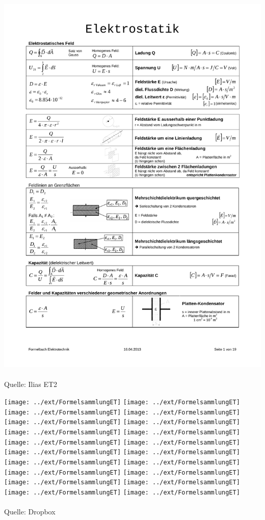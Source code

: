 \includegraphics[page=19,scale=0.57,trim=20mm 20mm 20mm 20mm]{../ext/ET-Formelsammlung}
\\
\\
Quelle: Ilias ET2
\newpage

\texttt{[image: ../ext/FormelsammlungET]}\newpage
\texttt{[image: ../ext/FormelsammlungET]}\newpage
\texttt{[image: ../ext/FormelsammlungET]}\newpage
\texttt{[image: ../ext/FormelsammlungET]}\newpage
\texttt{[image: ../ext/FormelsammlungET]}\newpage
\texttt{[image: ../ext/FormelsammlungET]}\newpage
\texttt{[image: ../ext/FormelsammlungET]}\newpage
\texttt{[image: ../ext/FormelsammlungET]}\newpage
\texttt{[image: ../ext/FormelsammlungET]}\newpage
\texttt{[image: ../ext/FormelsammlungET]}\newpage
\texttt{[image: ../ext/FormelsammlungET]}\newpage
\texttt{[image: ../ext/FormelsammlungET]}\newpage
\texttt{[image: ../ext/FormelsammlungET]}\newpage
\texttt{[image: ../ext/FormelsammlungET]}\newpage
\texttt{[image: ../ext/FormelsammlungET]}\newpage
\texttt{[image: ../ext/FormelsammlungET]}\newpage
\texttt{[image: ../ext/FormelsammlungET]}\newpage
\texttt{[image: ../ext/FormelsammlungET]}\newpage
\texttt{[image: ../ext/FormelsammlungET]}\newpage
\texttt{[image: ../ext/FormelsammlungET]}
\\
\\
Quelle: Dropbox 
\newpage

